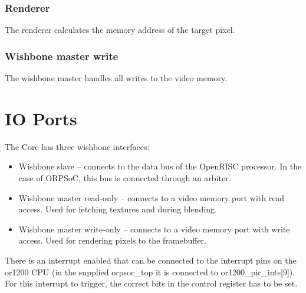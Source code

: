 \documentclass[10pt,a4paper]{article}
\begin{document}
\subsubsection{Renderer}
The renderer calculates the memory address of the target pixel.

\subsubsection{Wishbone master write}
The wishbone master handles all writes to the video memory.

\section{IO Ports}
The Core has three wishbone interfaces:

\begin{itemize}
\item Wishbone slave -- connects to the data bus of the OpenRISC processor. In the case of ORPSoC, this bus is connected through an arbiter.
\item Wishbone master read-only -- connects to a video memory port with read access. Used for fetching textures and during blending.
\item Wishbone master write-only -- connects to a video memory port with write access. Used for rendering pixels to the framebuffer.
\end{itemize}

There is an interrupt enabled that can be connected to the interrupt pins on the or1200 CPU (in the supplied orpsoc\_top it is connected to or1200\_pic\_ints[9]). For this interrupt to trigger, the correct bits in the control register has to be set.
\end{document}
